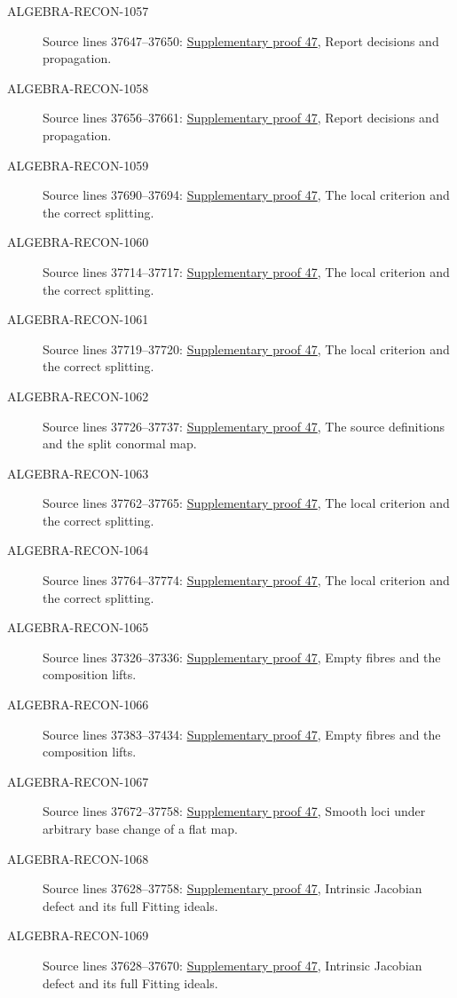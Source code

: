 \begin{description}
\item[ALGEBRA-RECON-1057] Source lines 37647--37650: \hyperlink{algebra_smooth_notes_20260928}{Supplementary proof 47}, Report decisions and propagation.
\item[ALGEBRA-RECON-1058] Source lines 37656--37661: \hyperlink{algebra_smooth_notes_20260928}{Supplementary proof 47}, Report decisions and propagation.
\item[ALGEBRA-RECON-1059] Source lines 37690--37694: \hyperlink{algebra_smooth_notes_20260928}{Supplementary proof 47}, The local criterion and the correct splitting.
\item[ALGEBRA-RECON-1060] Source lines 37714--37717: \hyperlink{algebra_smooth_notes_20260928}{Supplementary proof 47}, The local criterion and the correct splitting.
\item[ALGEBRA-RECON-1061] Source lines 37719--37720: \hyperlink{algebra_smooth_notes_20260928}{Supplementary proof 47}, The local criterion and the correct splitting.
\item[ALGEBRA-RECON-1062] Source lines 37726--37737: \hyperlink{algebra_smooth_notes_20260928}{Supplementary proof 47}, The source definitions and the split conormal map.
\item[ALGEBRA-RECON-1063] Source lines 37762--37765: \hyperlink{algebra_smooth_notes_20260928}{Supplementary proof 47}, The local criterion and the correct splitting.
\item[ALGEBRA-RECON-1064] Source lines 37764--37774: \hyperlink{algebra_smooth_notes_20260928}{Supplementary proof 47}, The local criterion and the correct splitting.
\item[ALGEBRA-RECON-1065] Source lines 37326--37336: \hyperlink{algebra_smooth_notes_20260928}{Supplementary proof 47}, Empty fibres and the composition lifts.
\item[ALGEBRA-RECON-1066] Source lines 37383--37434: \hyperlink{algebra_smooth_notes_20260928}{Supplementary proof 47}, Empty fibres and the composition lifts.
\item[ALGEBRA-RECON-1067] Source lines 37672--37758: \hyperlink{algebra_smooth_notes_20260928}{Supplementary proof 47}, Smooth loci under arbitrary base change of a flat map.
\item[ALGEBRA-RECON-1068] Source lines 37628--37758: \hyperlink{algebra_smooth_notes_20260928}{Supplementary proof 47}, Intrinsic Jacobian defect and its full Fitting ideals.
\item[ALGEBRA-RECON-1069] Source lines 37628--37670: \hyperlink{algebra_smooth_notes_20260928}{Supplementary proof 47}, Intrinsic Jacobian defect and its full Fitting ideals.
\end{description}


